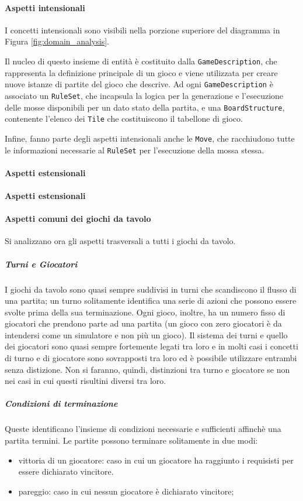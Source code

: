 \paragraph{Aspetti intensionali}
I concetti intensionali sono visibili nella porzione superiore del diagramma in Figura \ref{fig:domain_analysis}.

Il nucleo di questo insieme di entità è costituito dalla \texttt{GameDescription}, che rappresenta la definizione principale di un gioco e viene utilizzata per creare nuove istanze di partite del gioco che descrive.
%
Ad ogni \texttt{GameDescription} è associato un \texttt{RuleSet}, che incapsula la logica per la generazione e l'esecuzione delle mosse disponibili per un dato stato della partita, e una \texttt{BoardStructure}, contenente l'elenco dei \texttt{Tile} che costituiscono il tabellone di gioco.

Infine, fanno parte degli aspetti intensionali anche le \texttt{Move}, che racchiudono tutte le informazioni necessarie al \texttt{RuleSet} per l'esecuzione della mossa stessa.

\paragraph{Aspetti estensionali}

\paragraph{Aspetti estensionali}
%

\paragraph{Aspetti comuni dei giochi da tavolo}
%
Si analizzano ora gli aspetti trasversali a tutti i giochi da tavolo.
%
\subparagraph{Turni e Giocatori}
%
I giochi da tavolo sono quasi sempre suddivisi in turni che scandiscono il flusso di una partita; un turno solitamente identifica una serie di azioni che possono essere svolte prima della sua terminazione.
%
Ogni gioco, inoltre, ha un numero fisso di giocatori che prendono parte ad una partita (un gioco con zero giocatori è da intendersi come un simulatore e non più un gioco).
%
Il sistema dei turni e quello dei giocatori sono quasi sempre fortemente legati tra loro e in molti casi i concetti di turno e di giocatore sono sovrapposti tra loro ed è possibile utilizzare entrambi senza distizione.
%
Non si faranno, quindi, distinzioni tra turno e giocatore se non nei casi in cui questi risultini diversi tra loro.
%
\subparagraph{Condizioni di terminazione}
%
Queste identificano l'insieme di condizioni necessarie e sufficienti affinchè una partita termini.
%
Le partite possono terminare solitamente in due modi:
\begin{itemize}
    \item vittoria di un giocatore: caso in cui un giocatore ha raggiunto i requisisti per essere dichiarato vincitore.
    \item pareggio: caso in cui nessun giocatore è dichiarato vincitore;
\end{itemize}

